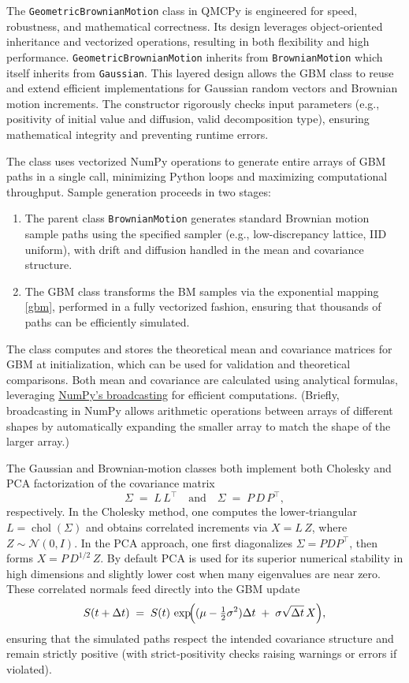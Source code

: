 \documentclass{article}
\begin{document}
The \texttt{GeometricBrownianMotion} class in QMCPy is engineered for speed, robustness, and mathematical correctness. Its design leverages object-oriented inheritance and vectorized operations, resulting in both flexibility and high performance.
\texttt{GeometricBrownianMotion} inherits from \texttt{BrownianMotion} which itself inherits from \texttt{Gaussian}. This layered design allows the GBM class to reuse and extend efficient implementations for Gaussian random vectors and Brownian motion increments.
The constructor rigorously checks input parameters (e.g., positivity of initial value and diffusion, valid decomposition type), ensuring mathematical integrity and preventing runtime errors.

The class uses vectorized NumPy operations to generate entire arrays of GBM paths in a single call, minimizing Python loops and maximizing computational throughput. Sample generation proceeds in two stages:
\begin{enumerate}
\item 
The parent class \texttt{BrownianMotion} generates standard Brownian motion sample paths using the specified sampler (e.g., low-discrepancy lattice, IID uniform), with drift and diffusion handled in the mean and covariance structure.
\item  The GBM class transforms the BM samples via the exponential mapping    \eqref{gbm}, performed in a fully vectorized fashion, ensuring that thousands of paths can be efficiently simulated.
\end{enumerate}
The class computes and stores the theoretical mean and covariance matrices for GBM at initialization, which can be used for validation and theoretical comparisons. Both mean and covariance are calculated using analytical formulas, leveraging \href{https://numpy.org/devdocs/user/basics.broadcasting.html}{NumPy’s broadcasting} for efficient computations. (Briefly, broadcasting in NumPy allows arithmetic operations between arrays of different shapes by automatically expanding the smaller array to match the shape of the larger array.)

 The Gaussian and Brownian‐motion classes both implement both Cholesky and PCA factorization of the covariance matrix
\[
\Sigma \;=\; L\,L^{\!\top}
\quad\text{and}\quad
\Sigma \;=\; P\,D\,P^{\!\top},
\]
respectively.  In the Cholesky method, one computes the lower‐triangular $L=\operatorname{chol}(\Sigma)$ and obtains correlated increments via $X=L\,Z$, where $Z\sim\mathcal{N}(0,I)$.  In the PCA approach, one first diagonalizes $\Sigma=PDP^{\!\top}$, then forms $X = P\,D^{1/2}\,Z$.  By default PCA is used for its superior numerical stability in high dimensions and slightly lower cost when many eigenvalues are near zero.  These correlated normals feed directly into the GBM update
\[
S(t+\Delta t) \;=\; S(t)\,\exp\!\Bigl((\mu - \tfrac12\sigma^2)\Delta t \;+\;\sigma\sqrt{\Delta t}\,X\Bigr),
\]
ensuring that the simulated paths respect the intended covariance structure and remain strictly positive (with strict‐positivity checks raising warnings or errors if violated).
\end{document}
